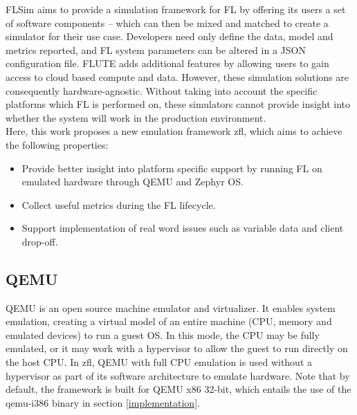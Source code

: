 \documentclass[12pt]{article}
\begin{document}
FLSim\cite{li_2021_flsim} aims to provide a simulation framework for FL by offering its users a set
of software components --
which can then be mixed and matched to create a simulator for their use case. Developers need only
define the data, model and metrics reported, and FL system parameters can be altered in a JSON
configuration file. FLUTE\cite{garcia_2022_flute} adds additional features by allowing users to gain access to cloud based
compute and data. However, these simulation solutions are consequently hardware-agnostic. Without
taking into account the specific platforms which FL is performed on, these simulators cannot provide
insight into whether the system will work in the production environment.\\

Here, this work proposes a new emulation framework zfl, which aims to achieve the following
properties:
\begin{itemize}
  \item Provide better insight into platform specific support by running FL on emulated hardware
    through QEMU and Zephyr OS.
  \item Collect useful metrics during the FL lifecycle.
  \item Support implementation of real word issues such as variable data and client drop-off.
\end{itemize}

\subsection{QEMU}
QEMU\cite{qemu} is an open source machine emulator and virtualizer. It enables system emulation,
creating a virtual model of an entire machine (CPU, memory and emulated devices) to run a guest OS.
In this mode, the CPU may be fully emulated, or it may work with a hypervisor to allow the guest to
run directly on the host CPU. In zfl, QEMU with full CPU emulation is used without a hypervisor as
part of its software architecture to emulate hardware. Note that by default, the framework
is built for QEMU x86 32-bit, which entails the use of the qemu-i386 binary in section \ref{implementation}.
\end{document}
